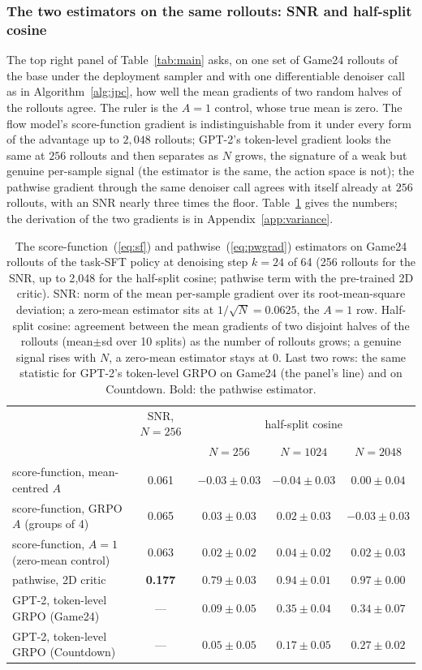 \subsubsection{The two estimators on the same rollouts: SNR and half-split cosine}
\label{app:snr}
The top right panel of Table~\ref{tab:main} asks, on one set of Game24 rollouts of the base under the deployment sampler and with one differentiable denoiser call as in Algorithm~\ref{alg:jpc}, how well the mean gradients of two random halves of the rollouts agree. The ruler is the $A{=}1$ control, whose true mean is zero. The flow model's score-function gradient is indistinguishable from it under every form of the advantage up to $2{,}048$ rollouts; GPT-2's token-level gradient looks the same at $256$ rollouts and then separates as $N$ grows, the signature of a weak but genuine per-sample signal (the estimator is the same, the action space is not); the pathwise gradient through the same denoiser call agrees with itself already at $256$ rollouts, with an SNR nearly three times the floor. Table~\ref{tab:snr} gives the numbers; the derivation of the two gradients is in Appendix~\ref{app:variance}.

\begin{table}[!t]
\centering\small
\caption{The score-function~(\ref{eq:sf}) and pathwise~(\ref{eq:pwgrad}) estimators on Game24 rollouts of the task-SFT policy at denoising step $k{=}24$ of 64 (256 rollouts for the SNR, up to 2{,}048 for the half-split cosine; pathwise term with the pre-trained 2D critic). SNR: norm of the mean per-sample gradient over its root-mean-square deviation; a zero-mean estimator sits at $1/\sqrt N=0.0625$, the $A{=}1$ row. Half-split cosine: agreement between the mean gradients of two disjoint halves of the rollouts (mean$\pm$sd over 10 splits) as the number of rollouts grows; a genuine signal rises with $N$, a zero-mean estimator stays at $0$. Last two rows: the same statistic for GPT-2's token-level GRPO on Game24 (the panel's line) and on Countdown. Bold: the pathwise estimator.}
\label{tab:snr}
\setlength{\tabcolsep}{4pt}
\begin{tabular}{@{}lc|ccc@{}}
\toprule
 & SNR, $N{=}256$ & \multicolumn{3}{c}{half-split cosine} \\
 & & $N{=}256$ & $N{=}1024$ & $N{=}2048$ \\
\midrule
score-function, mean-centred $A$ & 0.061 & $-0.03\pm0.03$ & $-0.04\pm0.03$ & $0.00\pm0.04$ \\
score-function, GRPO $A$ (groups of 4) & 0.065 & $0.03\pm0.03$ & $0.02\pm0.03$ & $-0.03\pm0.03$ \\
score-function, $A{=}1$ (zero-mean control) & 0.063 & $0.02\pm0.02$ & $0.04\pm0.02$ & $0.02\pm0.03$ \\
pathwise, 2D critic & \textbf{0.177} & $\mathbf{0.79\pm0.03}$ & $\mathbf{0.94\pm0.01}$ & $\mathbf{0.97\pm0.00}$ \\
\midrule
GPT-2, token-level GRPO (Game24) & --- & $0.09\pm0.05$ & $0.35\pm0.04$ & $0.34\pm0.07$ \\
GPT-2, token-level GRPO (Countdown) & --- & $0.05\pm0.05$ & $0.17\pm0.05$ & $0.27\pm0.02$ \\
\bottomrule
\end{tabular}
\end{table}

